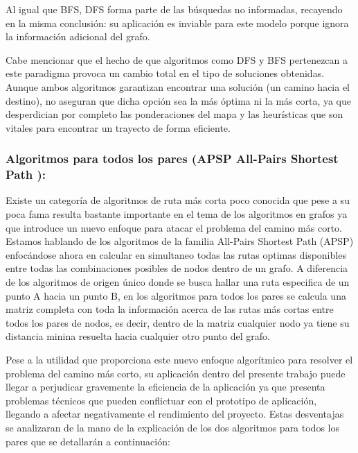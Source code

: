 \begin{itemize}
    Al igual que BFS, DFS forma parte de las búsquedas no informadas, recayendo en la misma conclusión: su aplicación es inviable para este modelo porque ignora la información adicional del grafo. 
    
    Cabe mencionar que el hecho de que algoritmos como DFS y BFS pertenezcan a este paradigma provoca un cambio total en el tipo de soluciones obtenidas. Aunque ambos algoritmos garantizan encontrar una solución (un camino hacia el destino), no aseguran que dicha opción sea la más óptima ni la más corta, ya que desperdician por completo las ponderaciones del mapa y las heurísticas que son vitales para encontrar un trayecto de forma eficiente.

\end{itemize}

\subsubsection{Algoritmos para todos los pares (APSP All-Pairs Shortest Path ):}

Existe un categoría de algoritmos de ruta más corta poco conocida que pese a su poca fama resulta bastante importante en el tema de los algoritmos en grafos ya que introduce un nuevo enfoque para atacar el problema del camino más corto. Estamos hablando de los algoritmos de la familia All-Pairs Shortest Path (APSP) enfocándose ahora en calcular en simultaneo todas las rutas optimas disponibles entre todas las combinaciones posibles de nodos dentro de un grafo. A diferencia de los algoritmos de origen único donde se busca hallar una ruta especifica de un punto A hacia un punto B, en los algoritmos para todos los pares se calcula una matriz completa con toda la información acerca de las rutas más cortas entre todos los pares de nodos, es decir, dentro de la matriz cualquier nodo ya tiene su distancia minina resuelta hacia cualquier otro punto del grafo. 

Pese a la utilidad que proporciona este nuevo enfoque algorítmico para resolver el problema del camino más corto, su aplicación dentro del presente trabajo puede llegar a perjudicar gravemente la eficiencia de la aplicación ya que presenta problemas técnicos que pueden conflictuar con el prototipo de aplicación, llegando a afectar negativamente el rendimiento del proyecto. Estas desventajas se analizaran de la mano de la explicación de los dos algoritmos para todos los pares que se detallarán a continuación:

